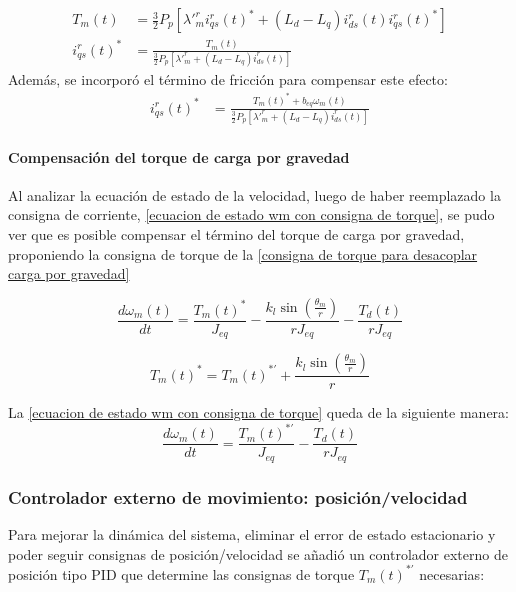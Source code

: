 \documentclass[a4paper, 10pt, onecolumn,journal]{ieeeconf}
\begin{document}
\begin{align}
	T_m(t) &= \frac{3}{2} P_p [\lambda'^r_{m} {i^r_{qs}(t)}^* + (L_d - L_q) i^r_{ds}(t) {i^r_{qs}(t)}^*] \label{torque electromagnetico 2}\\
	{i^r_{qs}(t)}^* &= \frac{T_m(t)}{\frac{3}{2} P_p [\lambda'^r_{m} + (L_d - L_q) i^r_{ds}(t)]}
\end{align}
 Además, se incorporó el término de fricción para compensar este efecto:
 \begin{align}
 	{i^r_{qs}(t)}^* &= \frac{{T_m(t)}^* + b_{eq} \omega_m(t) }{\frac{3}{2} P_p [\lambda'^r_{m} + (L_d - L_q) i^r_{ds}(t)]}
 \end{align}
	
\paragraph{\textbf{Compensación del torque de carga por gravedad}}
Al analizar la ecuación de estado de la velocidad, luego de haber reemplazado la consigna de corriente,
\cref{ecuacion de estado wm con consigna de torque}, se pudo ver que es posible compensar el término del torque de carga por gravedad, proponiendo la consigna de torque
de la \cref{consigna de torque para desacoplar carga por gravedad}

\begin{equation}
	\frac{d \omega_m(t)}{dt} = \frac{{T_m(t)}^*}{ J_{eq}} - \frac{k_l \sin \left( \frac{\theta_m}{r}\right) }{r J_{eq}} - \frac{T_d(t)}{r J_{eq}}
	\label{ecuacion de estado wm con consigna de torque}
\end{equation}

\begin{equation}
	{T_m(t)}^* = {T_m(t)}^{*'} + \frac{k_l \sin \left( \frac{\theta_m}{r}\right) }{r}
	\label{consigna de torque para desacoplar carga por gravedad}
\end{equation}

La \cref{ecuacion de estado wm con consigna de torque} queda de la siguiente manera:
\begin{equation}
	\frac{d \omega_m(t)}{dt} = \frac{{T_m(t)}^{*'}}{ J_{eq}}- \frac{T_d(t)}{r J_{eq}}
	\label{ecuacion de estado wm sin gravedad}
\end{equation}

\subsubsection{\textbf{Controlador externo de movimiento: posición/velocidad}}
Para mejorar la dinámica del sistema, eliminar el error de estado estacionario y poder seguir consignas de posición/velocidad se añadió un controlador externo de posición tipo PID que determine las consignas de torque $T_m(t)^{*'}$ necesarias:
\end{document}
